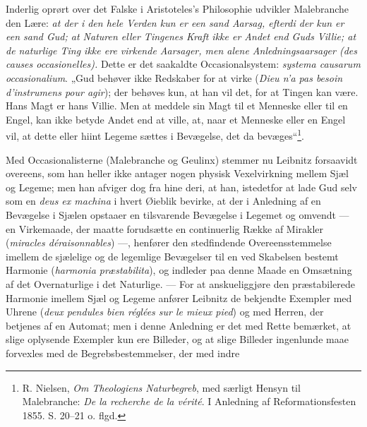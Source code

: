 \documentclass[12pt,a4paper]{book}
\begin{document}
Inderlig oprørt over det Falske i Aristoteles's Philosophie udvikler Malebranche
den Lære: \emph{at der i den hele Verden kun er een sand Aarsag, efterdi der kun
er een sand Gud; at Naturen eller Tingenes Kraft ikke er Andet end Guds Villie;
at de naturlige
\setcounter{footnote}{0}
Ting ikke ere virkende Aarsager, men alene Anledningsaarsager (\textit{des causes
occasionelles}).}
Dette er det saakaldte Occasionalsystem: \textit{systema causarum
occasionalium}. „Gud behøver ikke Redskaber for at virke (\textit{Dieu n'a pas
besoin d'instrumens pour agir}); der behøves kun, at han vil det, for at Tingen
kan være. Hans Magt er hans Villie. Men at meddele sin Magt til et Menneske eller
til en Engel, kan ikke betyde Andet end at ville, at, naar et Menneske eller en
Engel vil, at dette eller hiint Legeme sættes i Bevægelse, det da
bevæges“\footnote{R. Nielsen, \emph{Om Theologiens Naturbegreb}, med særligt
Hensyn til Malebranche: \textit{De la recherche de la vérité}. I Anledning af
Reformationsfesten 1855. S. 20--21 o. flgd.}.

Med Occasionalisterne (Malebranche og Geulinx) stemmer nu Leibnitz forsaavidt
overeens, som han heller ikke antager nogen physisk Vexelvirkning mellem Sjæl og
Legeme; men han afviger dog fra hine deri, at han, istedetfor at lade Gud selv
som en \textit{deus ex machina} i hvert Øieblik bevirke, at der i Anledning af en
Bevægelse i Sjælen opstaaer en tilsvarende Bevægelse i Legemet og omvendt --- en
Virkemaade, der maatte forudsætte en continuerlig Række af Mirakler
(\textit{miracles déraisonnables}) ---, henfører den stedfindende
Overeensstemmelse imellem de sjælelige og de legemlige Bevægelser til en ved
Skabelsen bestemt Harmonie (\textit{harmonia præstabilita}), og indleder paa
denne Maade en Omsætning af det Overnaturlige i det Naturlige. --- For at
anskueliggjøre den præstabilerede Harmonie imellem Sjæl og Legeme anfører
Leibnitz de bekjendte Exempler med Uhrene (\textit{deux pendules bien réglées sur
le mieux pied}) og med Herren, der betjenes af en Automat; men i denne Anledning
er det med Rette bemærket, at slige oplysende Exempler kun ere Billeder, og at
slige Billeder ingenlunde maae forvexles med de Begrebsbestemmelser, der med
indre
\end{document}

